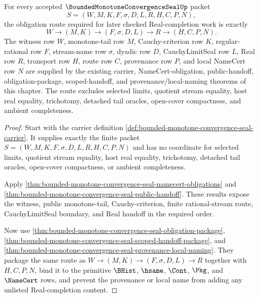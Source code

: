 \begin{theorem}
\label{thm:bounded-monotone-convergence-seal-checked-obligation-route}
For every accepted $\BoundedMonotoneConvergenceSealUp$ packet
$$
S=(W,M,K,F,\sigma,D,L,R,H,C,P,N),
$$
the obligation route required for later checked Real-completion work is exactly
$$
W \to (M,K) \to (F,\sigma,D,L) \to R \to (H,C,P,N).
$$
The witness row $W$, monotone-tail row $M$, Cauchy-criterion row $K$, regular-rational row $F$, stream-name row $\sigma$, dyadic row $D$, CauchyLimitSeal row $L$, Real row $R$, transport row $H$, route row $C$, provenance row $P$, and local NameCert row $N$ are supplied by the existing carrier, NameCert-obligation, public-handoff, obligation-package, scoped-handoff, and provenance/local-naming theorems of this chapter. The route excludes selected limits, quotient stream equality, host real equality, trichotomy, detached tail oracles, open-cover compactness, and ambient completeness.
\end{theorem}
\begin{proof}
Start with the carrier definition \autoref{def:bounded-monotone-convergence-seal-carrier}. It supplies exactly the finite packet $S=(W,M,K,F,\sigma,D,L,R,H,C,P,N)$ and has no coordinate for selected limits, quotient stream equality, host real equality, trichotomy, detached tail oracles, open-cover compactness, or ambient completeness.

Apply \autoref{thm:bounded-monotone-convergence-seal-namecert-obligations} and \autoref{thm:bounded-monotone-convergence-seal-public-handoff}. These results expose the witness, public monotone-tail, Cauchy-criterion, finite rational-stream route, CauchyLimitSeal boundary, and Real handoff in the required order.

Now use \autoref{thm:bounded-monotone-convergence-seal-obligation-package}, \autoref{thm:bounded-monotone-convergence-seal-scoped-handoff-package}, and \autoref{thm:bounded-monotone-convergence-seal-provenance-local-naming}. They package the same route as $W \to (M,K) \to (F,\sigma,D,L) \to R$ together with $H,C,P,N$, bind it to the primitive $\BHist$, $\hsame$, $\Cont$, $\Pkg$, and $\NameCert$ rows, and prevent the provenance or local name from adding any unlisted Real-completion content.
\end{proof}

